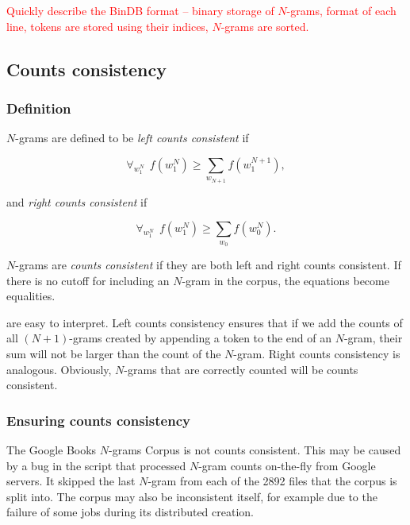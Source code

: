 \documentclass[draft]{IIBproject}
\makeatletter
\DeclareRobustCommand{\noteSelf}[1]{\textcolor{red}{#1}}
\DeclareRobustCommand{\npgrams}{\mbox{$(N{+}1)$-grams}\@\xspace}
\makeatother
\begin{document}
\noteSelf{Quickly describe the BinDB format -- binary storage of $N$-grams, format of each line, tokens are stored using their indices, $N$-grams are sorted.}

\FloatBarrier
\subsection{Counts consistency}
\label{sec:counts_consistency}

\subsubsection{Definition}

$N$-grams are defined to be \emph{left counts consistent} if

\begin{equation}
\label{eq:left_counts_consistency}
\forall_{w_1^N} ~~ f(w_1^N) \ge \sum_{w_{N+1}} f(w_1^{N+1}),
\end{equation}

and \emph{right counts consistent} if

\begin{equation}
\label{eq:right_counts_consistency}
\forall_{w_1^N} ~~ f(w_1^N) \ge \sum_{w_0} f(w_0^N).
\end{equation}

$N$-grams are \emph{counts consistent} if they are both left and right counts consistent. If there is no cutoff for including an $N$-gram in the corpus, the equations become equalities.

 are easy to interpret. Left counts consistency ensures that if we add the counts of all \npgrams created by appending a token to the end of an $N$-gram, their sum will not be larger than the count of the $N$-gram. Right counts consistency is analogous. Obviously, $N$-grams that are correctly counted will be counts consistent.

\subsubsection{Ensuring counts consistency}

The Google Books $N$-grams Corpus is not counts consistent. This may be caused by a bug in the script that processed $N$-gram counts on-the-fly from Google servers. It skipped the last $N$-gram from each of the 2892 files that the corpus is split into. The corpus may also be inconsistent itself, for example due to the failure of some jobs during its distributed creation.
\end{document}
